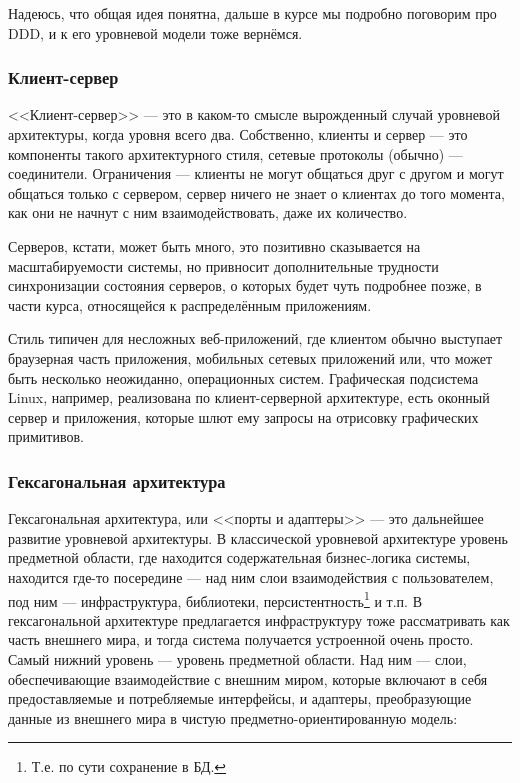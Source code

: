 \documentclass[a5paper]{article}
\begin{document}
Надеюсь, что общая идея понятна, дальше в курсе мы подробно поговорим про DDD, и к его уровневой модели тоже вернёмся.

\subsubsection{Клиент-сервер}

<<Клиент-сервер>> --- это в каком-то смысле вырожденный случай уровневой архитектуры, когда уровня всего два. Собственно, клиенты и сервер --- это компоненты такого архитектурного стиля, сетевые протоколы (обычно) --- соединители. Ограничения --- клиенты не могут общаться друг с другом и могут общаться только с сервером, сервер ничего не знает о клиентах до того момента, как они не начнут с ним взаимодействовать, даже их количество. 

Серверов, кстати, может быть много, это позитивно сказывается на масштабируемости системы, но привносит дополнительные трудности синхронизации состояния серверов, о которых будет чуть подробнее позже, в части курса, относящейся к распределённым приложениям.

Стиль типичен для несложных веб-приложений, где клиентом обычно выступает браузерная часть приложения, мобильных сетевых приложений или, что может быть несколько неожиданно, операционных систем. Графическая подсистема Linux, например, реализована по клиент-серверной архитектуре, есть оконный сервер и приложения, которые шлют ему запросы на отрисовку графических примитивов.

\subsubsection{Гексагональная архитектура}

Гексагональная архитектура, или <<порты и адаптеры>> --- это дальнейшее развитие уровневой архитектуры. В классической уровневой архитектуре уровень предметной области, где находится содержательная бизнес-логика системы, находится где-то посередине --- над ним слои взаимодействия с пользователем, под ним --- инфраструктура, библиотеки, персистентность\footnote{Т.е. по сути сохранение в БД.} и т.п. В гексагональной архитектуре предлагается инфраструктуру тоже рассматривать как часть внешнего мира, и тогда система получается устроенной очень просто. Самый нижний уровень --- уровень предметной области. Над ним --- слои, обеспечивающие взаимодействие с внешним миром, которые включают в себя предоставляемые и потребляемые интерфейсы, и адаптеры, преобразующие данные из внешнего мира в чистую предметно-ориентированную модель:
\end{document}

